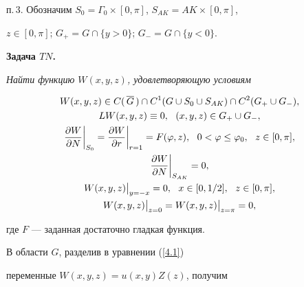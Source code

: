 п.\,3. Обозначим $S_0=\Gamma_0\times [0,\pi]$, $S_{AK}=AK\times [0,\pi]$, 


$z\in[0,\pi]$; $G_+=G\cap\{y>0\}$; $G_- =G\cap\{y<0\}$.


\medskip





{\bf Задача $TN$.}


{\it Найти функцию $W(x,y,z)$, удовлетворяющую условиям


\begin{gather}


W(x,y,z)\in {C}(\,\overline G\,)\cap


{C}^1(G\cup S_0\cup S_{AK})


\cap {C}^2(G_+\cup G_-), \notag \\


%


LW(x,y,z)\equiv 0,\ \ (x,y,z)\in G_+\cup G_-, \notag \\


%


\frac{\partial W}{\partial N}\bigg|_{S_0}=\frac{\partial W}{\partial r}


\bigg|_{r=1}=F(\varphi,z),


\ \ 0<\varphi\leq\varphi_0,\ \ z\in[0,\pi],\label{a4.1}\\


%


\frac{\partial W}{\partial N}\bigg|_{S_{AK}}=0,\notag \\


%


W(x,y,z)\big|_{y=-x}=0,\ \ x\in [0,1/2],\ \ z\in[0,\pi],\notag \\


%


W(x,y,z)\big|_{z=0}=W(x,y,z)\big|_{z=\pi}=0,\notag


\end{gather}


где $F$ --- заданная достаточно гладкая функция.}


\medskip





В области $G$, разделив в уравнении (\ref{4.1})


переменные $W(x,y,z)=u(x,y)Z(z)$, получим


